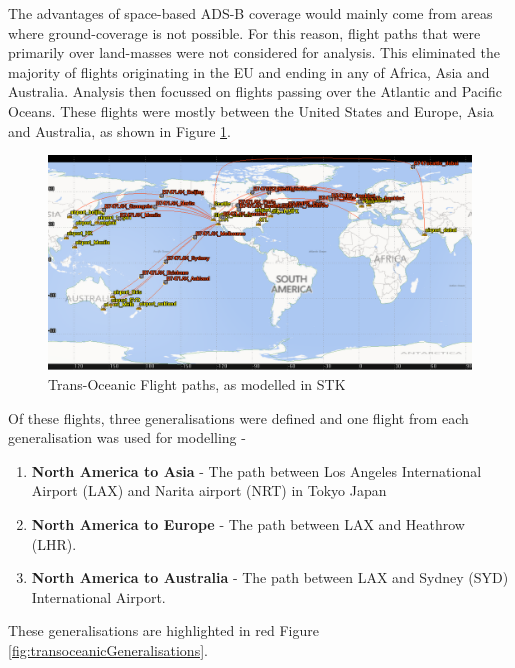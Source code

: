 The advantages of space-based ADS-B coverage would mainly come from areas where ground-coverage is not possible. For this reason, flight paths that were primarily over land-masses were not considered for analysis. This eliminated the majority of flights originating in the EU and ending in any of Africa, Asia and Australia. Analysis then focussed on flights passing over the Atlantic and Pacific Oceans. These flights were mostly between the United States and Europe, Asia and Australia, as shown in Figure \ref{fig:transoceanicflights}.

\begin{figure}[H]
	\centering
	\includegraphics[scale = 0.45]{Pictures/transoceanicflights.png}
	
	\caption{Trans-Oceanic Flight paths, as modelled in STK}
	\label{fig:transoceanicflights}
\end{figure} 

Of these flights, three generalisations were defined and one flight from each generalisation was used for modelling -
\begin{enumerate}
	\item \textbf{North America to Asia} - The path between Los Angeles International Airport (LAX) and Narita airport (NRT) in Tokyo Japan 
	\item \textbf{North America to Europe} - The path between LAX and Heathrow (LHR).
	\item \textbf{North America to Australia} - The path between LAX and Sydney (SYD) International Airport.
\end{enumerate}
These generalisations are highlighted in red Figure \ref{fig:transoceanicGeneralisations}.


